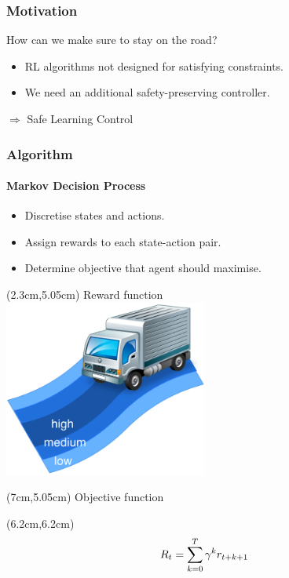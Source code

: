 \documentclass[t]{beamer}
\begin{document}
\begin{frame}
\frametitle{Motivation}
How can we make sure to stay on the road?
\vspace{0.5cm}
\begin{itemize}
\item RL algorithms not designed for satisfying constraints.
\item We need an additional safety-preserving controller.
\end{itemize}
\vspace{1cm}
$\Rightarrow$ Safe Learning Control
\end{frame}



\begin{frame}
\frametitle{Algorithm}
\framesubtitle{Markov Decision Process}
\begin{itemize}
\item Discretise states and actions.
\item Assign rewards to each state-action pair.
\item Determine objective that agent should maximise.
\end{itemize}
\begin{textblock*}{7cm}(2.3cm,5.05cm) %
\small{Reward function}\\
\includegraphics[trim=0mm 0mm 0mm 0mm, width=0.5\textwidth]{Reward}
\end{textblock*}
\begin{textblock*}{5cm}(7cm,5.05cm) %
\small{Objective function}
\end{textblock*}
\begin{textblock*}{5cm}(6.2cm,6.2cm) 
\begin{equation*}
\noindent
R_t = \sum_{k=0}^T\gamma^kr_{t+k+1}
\end{equation*}
\end{textblock*}
\end{frame}
\end{document}

